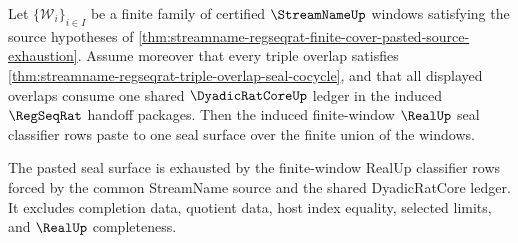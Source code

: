 \begin{theorem}
\label{thm:streamname-regseqrat-finite-cover-pasted-seal-exhaustion}
Let $\{\mathcal{W}_i\}_{i\in I}$ be a finite family of certified
$\StreamNameUp$ windows satisfying the source hypotheses of
\autoref{thm:streamname-regseqrat-finite-cover-pasted-source-exhaustion}.
Assume moreover that every triple overlap satisfies
\autoref{thm:streamname-regseqrat-triple-overlap-seal-cocycle}, and that all
displayed overlaps consume one shared $\DyadicRatCoreUp$ ledger in the
induced $\RegSeqRat$ handoff packages. Then the induced finite-window
$\RealUp$ seal classifier rows paste to one seal surface over the finite union
of the windows.

The pasted seal surface is exhausted by the finite-window RealUp classifier
rows forced by the common StreamName source and the shared DyadicRatCore
ledger. It excludes completion data, quotient data, host index equality,
selected limits, and $\RealUp$ completeness.
\end{theorem}
